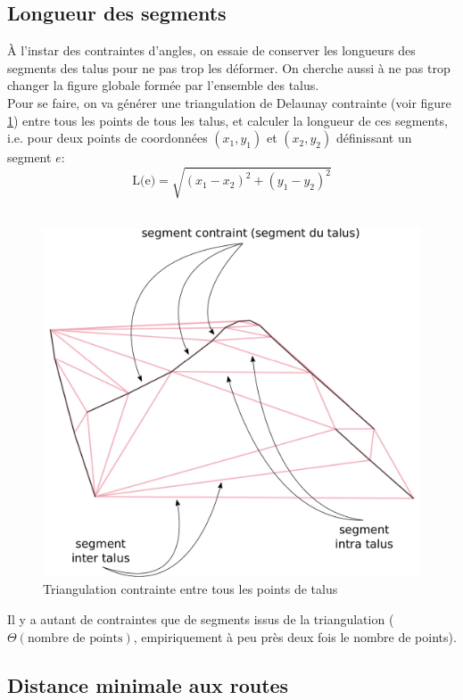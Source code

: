 \documentclass[11pt]{article}
\begin{document}
\subsection{Longueur des segments}
À l'instar des contraintes d'angles, on essaie de conserver les longueurs des segments des talus pour ne pas trop les déformer. On cherche aussi à ne pas trop changer la figure globale formée par l'ensemble des talus.\\
Pour se faire, on va générer une triangulation de Delaunay contrainte (voir figure \ref{triangulation}) entre tous les points de tous les talus, et calculer la longueur de ces segments, i.e. pour deux points de coordonnées $(x_1,y_1)$ et $(x_2, y_2)$ définissant un segment $e$:
\begin{equation}
\text{L(e)} = \sqrt{(x_1 - x_2)^2 + (y_1- y_2)^2}
\label{length_segment}
\end{equation}
\\
\begin{figure}[htp]
\centering
\includegraphics[scale=0.4]{triangulation.pdf}
\caption{Triangulation contrainte entre tous les points de talus}
\label{triangulation}
\end{figure}

Il y a autant de contraintes que de segments issus de la triangulation ($\Theta(\text{nombre de points})$, empiriquement à peu près deux fois le nombre de points).

\subsection{Distance minimale aux routes}
\end{document}
